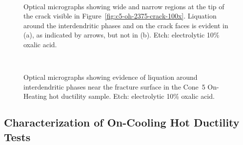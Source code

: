 {\begin{figure}
    \centering
     \\
    \caption{Optical micrographs showing wide and narrow regions at the tip of the crack visible in Figure~\ref{fig:c5-oh-2375-crack-100x}. Liquation around the interdendritic phases and on the crack faces is evident in (a), as indicated by arrows, but not in (b). Etch: electrolytic 10\% oxalic acid.}
    \label{fig:c5-oh-2375-crack-tip-500x}
\end{figure}

\begin{figure}
    \centering
     \\
    \caption{Optical micrographs showing evidence of liquation around interdendritic phases near the fracture surface in the Cone~5 On-Heating \protect{} hot ductility sample. Etch: electrolytic 10\% oxalic acid.}
    \label{fig:c5-oh-2375-liquation-fracture-surface}
\end{figure}
\clearpage


\subsection{Characterization of On-Cooling Hot Ductility Tests}
}
